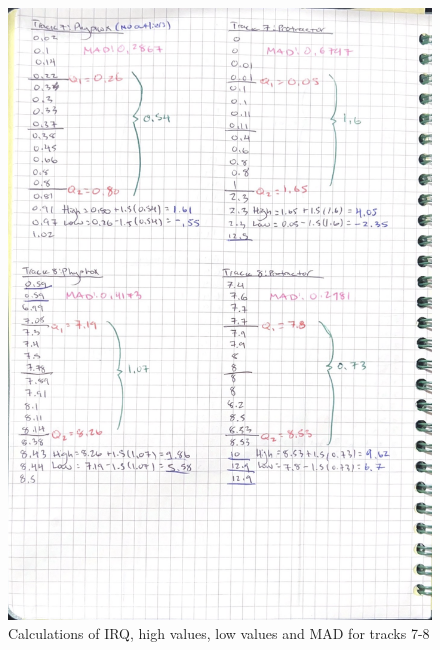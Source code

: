 \documentclass[idxtotoc,hyperref,openany]{labbook} %
\begin{document}
\begin{figure}[H] %
\begin{center}
\includegraphics[width=0.9\linewidth]{images/Lab.01/PhyProTrack7-8.png}
\end{center}
\caption{Calculations of IRQ, high values, low values and MAD for tracks 7-8}
\label{fig:Track7-8PhyphoxProtractor}
\end{figure}
\end{document}
